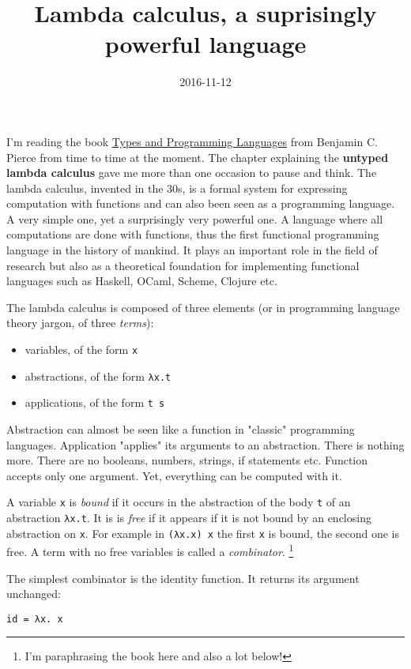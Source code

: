 \documentclass[11pt]{article}
\date{2016-11-12}
\title{Lambda calculus, a suprisingly powerful language}
\begin{document}
\maketitle
\tableofcontents

I'm reading the book \href{https://www.cis.upenn.edu/~bcpierce/tapl}{Types and Programming Languages} from Benjamin C.
Pierce from time to time at the moment. The chapter explaining the
\textbf{untyped lambda calculus} gave me more than one occasion to pause and
think. The lambda calculus, invented in the 30s, is a formal system
for expressing computation with functions and can also been seen as a
programming language. A very simple one, yet a surprisingly very
powerful one. A language where all computations are done with
functions, thus the first functional programming language in the
history of mankind. It plays an important role in the field of
research but also as a theoretical foundation for implementing
functional languages such as Haskell, OCaml, Scheme, Clojure etc.

The lambda calculus is composed of three elements (or in programming
language theory jargon, of three \emph{terms}):

\begin{itemize}
\item variables, of the form \texttt{x}
\item abstractions, of the form \texttt{λx.t}
\item applications, of the form \texttt{t s}
\end{itemize}

Abstraction can almost be seen like a function in "classic"
programming languages. Application "applies" its arguments to an
abstraction. There is nothing more. There are no booleans, numbers,
strings, if statements etc. Function accepts only one argument. Yet,
everything can be computed with it.

A variable \texttt{x} is \emph{bound} if it occurs in the abstraction of the body
\texttt{t} of an abstraction \texttt{λx.t}. It is is \emph{free} if it appears if it is
not bound by an enclosing abstraction on \texttt{x}. For example in \texttt{(λx.x)
x} the first \texttt{x} is bound, the second one is free. A term with no free
variables is called a \emph{combinator}. \footnote{I'm paraphrasing the book here and also a lot below!}

The simplest combinator is the identity function. It returns its
argument unchanged:

\texttt{id = λx. x}
\end{document}
